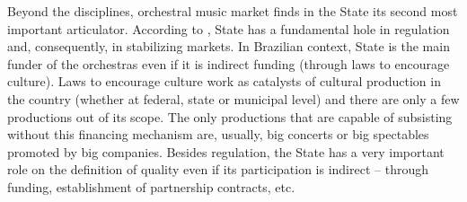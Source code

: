 \documentclass[a4paper, 12pt, openright, oneside, german, french, brazil, english, article]{abntex2}
\begin{document}
	Beyond the disciplines, orchestral music market finds in the State its second most important articulator. According to , State has a fundamental hole in regulation and, consequently, in stabilizing markets. In Brazilian context, State is the main funder of the orchestras even if it is indirect funding (through laws to encourage culture). Laws to encourage culture work as catalysts of cultural production in the country (whether at federal, state or municipal level) and there are only a few productions out of its scope. The only productions that are capable of subsisting without this financing mechanism are, usually, big concerts or big spectables promoted by big companies. Besides regulation, the State has a very important role on the definition of quality even if its participation is indirect -- through funding, establishment of partnership contracts, etc.
	
	
\end{document}
